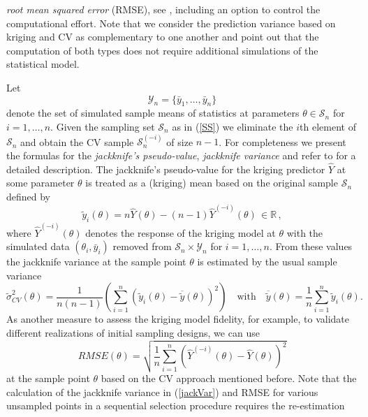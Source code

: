 \documentclass[article, nojss]{jss}
\numberwithin{equation}{section}			%
\newcommand{\R}{\mathbb{R}}
\newcommand{\Sample}{\mathcal{S}}
\begin{document}
\emph{root mean squared error} (RMSE), see \citet{Jin2002}, including an option
to control the computational effort. Note that we consider the prediction variance
based on kriging and CV as complementary to one another and point out that the computation
of both types does not require additional simulations of the statistical
model.\par
%
Let
\begin{equation} 
  \mathcal{Y}_n=\{\bar{y}_1,\ldots,\bar{y}_n\}  
\end{equation}
denote the set of simulated sample means of statistics at parameters
$\theta\in\Sample_n$ for $i=1,\ldots,n$. Given the sampling set $\Sample_n$ as in (\ref{SS})
we eliminate the $i$th element of $\Sample_n$ and obtain the CV sample $\Sample_n^{(-i)}$ of size $n-1$.
For completeness we present the formulas for the \emph{jackknife's
pseudo-value}, \emph{jackknife variance} and refer to \citet{Kleijnen2004a} for
a detailed description. The jackknife's pseudo-value for the kriging predictor
$\hat{Y}$ at some parameter $\theta$ is treated as a (kriging) mean based on the
original sample $\Sample_n$ defined by
\begin{equation}\label{pseudo}
  \tilde{y}_{i}(\theta) = n\hat{Y}(\theta)-(n-1)\hat{Y}^{(-i)}(\theta)\,\in\R\,,
\end{equation}
where $\hat{Y}^{(-i)}(\theta)$ denotes the response of the kriging model at
$\theta$ with the simulated data $(\theta_i,\bar{y}_i)$ removed from
$\Sample_n\times\mathcal{Y}_n$ for $i=1,\ldots,n$.
From these values the jackknife variance at the sample point $\theta$ is
estimated by the usual sample variance
\begin{equation}\label{jackVar}
  \tilde{\sigma}^2_{CV}(\theta) = \frac{1}{n(n-1)}\left(\sum_{i=1}^n(\tilde{y}_{i}(\theta)-\overline{\tilde{y}}(\theta))^2 \right)
  \quad\textrm{with}\quad\overline{\tilde{y}}(\theta)=\frac{1}{n}\sum_{i=1}^n \tilde{y}_{i}(\theta). 
\end{equation}
As another measure to assess the kriging model fidelity, for example, to
validate different realizations of initial sampling designs, we can use
\begin{equation}\label{rmsecv}
 RMSE(\theta) = \sqrt{\frac{1}{n}\sum_{i=1}^n \left(\hat{Y}^{(-i)}(\theta)- \hat{Y}(\theta)\right)^2}
\end{equation}
at the sample point $\theta$ based on the CV approach mentioned before. Note
that the calculation of the jackknife variance in (\ref{jackVar}) and RMSE for various
unsampled points in a sequential selection procedure requires the re-estimation
\end{document}
